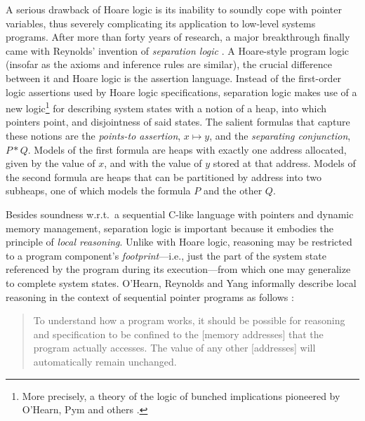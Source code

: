 \documentclass[11pt]{article}
\begin{document}
A serious drawback of Hoare logic is its inability to soundly cope with pointer variables, thus severely complicating its application to low-level systems programs. After more than forty years of research, a major breakthrough finally came with Reynolds' invention of \emph{separation logic} \cite{DBLP:conf/lics/Reynolds02}. A Hoare-style program logic (insofar as the axioms and inference rules are similar), the crucial difference between it and Hoare logic is the assertion language. Instead of the first-order logic assertions used by Hoare logic specifications, separation logic makes use of a new logic\footnote{More precisely, a theory of the logic of bunched implications pioneered by O'Hearn, Pym and others \cite{DBLP:journals/bsl/OHearnP99,DBLP:journals/tcs/PymOY04}.}  for describing system states with a notion of a heap, into which pointers point, and disjointness of said states. The salient formulas that capture these notions are the \emph{points-to assertion}, $x \mapsto y$, and the \emph{separating conjunction}, $P * Q$. Models of the first formula are heaps with exactly one address allocated, given by the value of $x$, and with the value of $y$ stored at that address. Models of the second formula are heaps that can be partitioned by address into two subheaps, one of which models the formula $P$ and the other $Q$.

Besides soundness w.r.t.~a sequential C-like language with pointers and dynamic memory management, separation logic is important because it embodies the principle of \emph{local reasoning}. Unlike with Hoare logic, reasoning may be restricted to a program component's \emph{footprint}---i.e., just the part of the system state referenced by the program during its execution---from which one may generalize to complete system states. O'Hearn, Reynolds and Yang informally describe local reasoning in the context of sequential pointer programs as follows \cite{DBLP:conf/csl/OHearnRY01}: \begin{quotation}\noindent To understand how a program works, it should be possible for reasoning and specification to be confined to the [memory addresses] that the program actually accesses. The value of any other [addresses] will automatically remain unchanged.\end{quotation}
\end{document}
